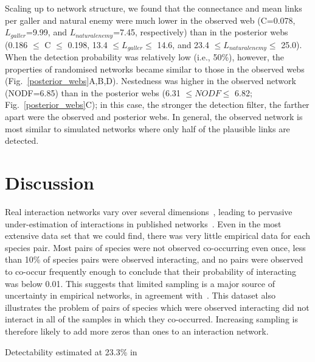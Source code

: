 \documentclass[12pt]{article}
\begin{document}
\begin{spacing}{2.0}
  Scaling up to network structure, we found that the connectance and mean links per galler and natural enemy were much lower in the observed web (C=0.078, $L_{galler}$=9.99, and $L_{natural enemy}$=7.45, respectively) than in the posterior webs (0.186 $\leq$ C $\leq$ 0.198, 13.4 $\leq L_{galler} \leq$ 14.6, and 23.4 $\leq L_{natural enemy} \leq$ 25.0). When the detection probability was relatively low (i.e., 50\%), however, the properties of randomised networks became similar to those in the observed webs (Fig.~\ref{posterior_webs}A,B,D). Nestedness was higher in the observed network (NODF=6.85) than in the posterior webs (6.31 $\leq NODF \leq$ 6.82; Fig.~\ref{posterior_webs}C); in this case, the stronger the detection filter, the farther apart were the observed and posterior webs. In general, the observed network is most similar to simulated networks where only half of the plausible links are detected. 


\section*{Discussion}

  Real interaction networks vary over several dimensions~\citep{Kitching1987,Olesen2011a,Pires2011a,Baiser2012,Fodrie2015,Novak2015}, leading to pervasive under-estimation of interactions in published networks~\citep{Jordano2016}. Even in the most extensive data set that we could find, there was very little empirical data for each species pair. Most pairs of species were not observed co-occurring even once, less than 10\% of species pairs were observed interacting, and no pairs were observed to co-occur frequently enough to conclude that their probability of interacting was below 0.01. This suggests that limited sampling is a major source of uncertainty in empirical networks, in agreement with~\citet{Jordano2016,Weinstein2017a,Weinstein2017}. This dataset also illustrates the problem of pairs of species which were observed interacting did not interact in all of the samples in which they co-occurred. Increasing sampling is therefore likely to add more zeros than ones to an interaction network.


  Detectability estimated at 23.3\% in~\citet{Weinstein2017a}


\end{spacing}
\end{document}
